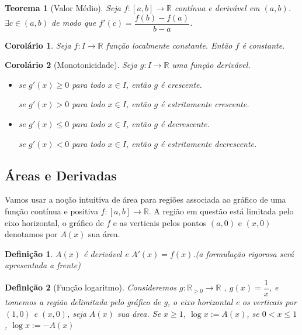 \documentclass[12pt]{article}
\newtheorem{theorem}{Teorema}[section]
\newtheorem{corollary}{Corolário}[theorem]
\newtheorem{definition}{Definição}
\begin{document}
\begin{theorem}[Valor Médio]
Seja $f: [a, b] \rightarrow{} \mathbb{R}$ contínua e derivável em $(a, b)$. $\exists c \in (a, b)$ de modo que $f'(c) = \dfrac{f(b) - f(a)}{b - a}$.
\end{theorem}

\begin{corollary}
    Seja $f: I \rightarrow{} \mathbb{R}$ função localmente constante. Então $f$ é constante.
\end{corollary}

\begin{corollary}[Monotonicidade]
    Seja $g: I \rightarrow{} \mathbb{R}$ uma função derivável.
    \begin{itemize}
        \item se $g'(x) \geq 0$ para todo $x \in I$, então $g$ é crescente.
        
        se $g'(x) > 0$ para todo $x \in I$, então $g$ é estritamente crescente.
        
        \item se $g'(x) \leq 0$ para todo $x \in I$, então $g$ é decrescente.
        
        se $g'(x) < 0$ para todo $x \in I$, então $g$ é estritamente decrescente.
    \end{itemize}
\end{corollary}

\subsection{Áreas e Derivadas}
Vamos usar a noção intuitiva de área para regiões associada ao gráfico de uma função contínua e positiva $f: [a, b] \rightarrow{} \mathbb{R}$. A região em questão está limitada pelo eixo horizontal, o gráfico de $f$ e as verticais pelos pontos $(a, 0)$ e $(x, 0)$ denotamos por $A(x)$ sua área.

\begin{definition}
    $A(x)$ é derivável e $A'(x) = f(x)$.(a formulação rigorosa será apresentada a frente)
\end{definition}

\begin{definition}[Função logaritmo]
    Consideremos $g: \mathbb{R}_{>0} \rightarrow{} \mathbb{R}$ , $g(x) = \dfrac{1}{x}$, e tomemos a região delimitada pelo gráfico de g, o eixo horizontal e os verticais por $(1, 0)$ e $(x, 0)$, seja $A(x)$ sua área. Se $x \geq 1$, $\log x := A(x)$, se $0 < x \leq 1$, $\log x := -A(x)$
\end{definition}
\end{document}

